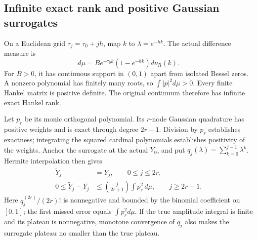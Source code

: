 \subsection{Infinite exact rank and positive Gaussian surrogates}
\label{subsec:continuum-Gauss-update}
On a Euclidean grid $\tau_j=\tau_0+jh$, map $k$ to
$\lambda=e^{-hk}$. The actual difference measure is
\[
 d\mu=B e^{-\tau_0k}(1-e^{-hk})d\nu_R(k).
\]
For $B>0$, it has continuous support in $(0,1)$ apart from isolated Bessel
zeros. A nonzero polynomial has finitely many roots, so $\int|p|^2d\mu>0$.
Every finite Hankel matrix is positive definite. The original continuum
therefore has infinite exact Hankel rank.

Let $p_r$ be its monic orthogonal polynomial. Its $r$-node Gaussian
quadrature has positive weights and is exact through degree $2r-1$.
Division by $p_r$ establishes exactness; integrating the squared cardinal
polynomials establishes positivity of the weights. Anchor the surrogate
at the actual $Y_0$, and put $q_j(\lambda)=\sum_{k=0}^{j-1}\lambda^k$.
Hermite interpolation then gives
\begin{align}
 \widetilde Y_j&=Y_j,\qquad 0\leq j\leq2r,\nonumber\\
 0\leq\widetilde Y_j-Y_j
 &\leq\binom{j}{2r+1}\int p_r^2\,d\mu,
       \qquad j\geq2r+1.
 \label{eq:continuum-Gauss-holdout-update}
\end{align}
Here $q_j^{(2r)}/(2r)!$ is nonnegative and bounded by the binomial
coefficient on $[0,1]$; the first missed error equals $\int p_r^2d\mu$.
If the true amplitude integral is finite and its plateau is nonnegative,
monotone convergence of $q_j$ also makes the surrogate plateau no smaller
than the true plateau.

